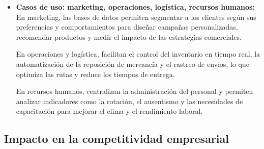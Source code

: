 \documentclass[12pt,a4paper]{article}
\begin{document}
\begin{itemize}
  Por ejemplo, una empresa de transporte puede analizar los tiempos de entrega, las rutas, el consumo de combustible y la cantidad de pedidos para diseñar recorridos más eficientes. Esto puede ayudar a reducir costos y mejorar la satisfacción del cliente.

  \item \textbf{Casos de uso: marketing, operaciones, logística, recursos humanos:} \\
  En marketing, las bases de datos permiten segmentar a los clientes según sus preferencias y comportamientos para diseñar campañas personalizadas, recomendar productos y medir el impacto de las estrategias comerciales.

  En operaciones y logística, facilitan el control del inventario en tiempo real, la automatización de la reposición de mercancía y el rastreo de envíos, lo que optimiza las rutas y reduce los tiempos de entrega.

  En recursos humanos, centralizan la administración del personal y permiten analizar indicadores como la rotación, el ausentismo y las necesidades de capacitación para mejorar el clima y el rendimiento laboral.
\end{itemize}

\subsection{Impacto en la competitividad empresarial}
\end{document}
